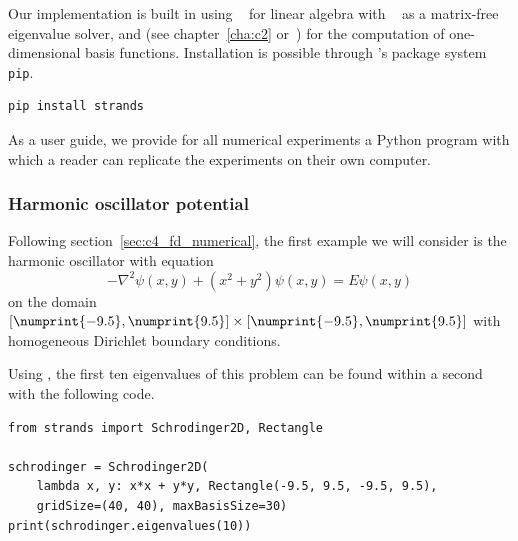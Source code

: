 Our implementation is built in \cpp{} using \Eigen{}~\cite{guennebaud_eigen_2010} for linear algebra with \spectra{}~\cite{qiu_spectra_2022} as a matrix-free eigenvalue solver, and  (see chapter~\ref{cha:c2} or~\cite{baeyens_fast_2020}) for the computation of one-dimensional basis functions. Installation is possible through \lpython{}'s package system \texttt{pip}.
\begin{verbatim}
pip install strands
\end{verbatim}

As a user guide, we provide for all numerical experiments a Python program with which a reader can replicate the experiments on their own computer.

\subsubsection{Harmonic oscillator potential}\label{sec:c4_numerical_harmonic}

Following section~\ref{sec:c4_fd_numerical}, the first example we will consider is the harmonic oscillator with equation
\begin{equation}\label{equ:c4_nm_harmonic}
    -\nabla^2 \psi(x, y) + \left(x^2 + y^2\right) \psi(x, y) = E \psi(x, y)
\end{equation}
on the domain $[\numprint{-9.5}, \numprint{9.5}] \times [\numprint{-9.5}, \numprint{9.5}]$ with homogeneous Dirichlet boundary conditions.

Using \strands{}, the first ten eigenvalues of this problem can be found within a second with the following code.
\begin{verbatim}
from strands import Schrodinger2D, Rectangle

schrodinger = Schrodinger2D(
    lambda x, y: x*x + y*y, Rectangle(-9.5, 9.5, -9.5, 9.5),
    gridSize=(40, 40), maxBasisSize=30)
print(schrodinger.eigenvalues(10))
\end{verbatim}


